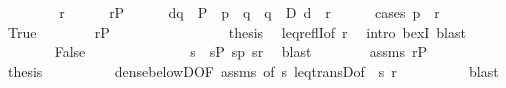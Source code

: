 \begin{isabellebody}
\ \ \isamarkupfalse%
\isanewline
\ \ \ \ \isamarkupfalse%
\ r\isanewline
\ \ \ \ \isamarkupfalse%
\ {\isachardoublequoteopen}r{\isasymin}P{\isachardoublequoteclose}\isanewline
\ \ \ \ \isamarkupfalse%
\ {\isachardoublequoteopen}{\isasymexists}d{\isasymin}{\isacharbraceleft}{\kern0pt}q\ {\isasymin}\ P\ {\isachardot}{\kern0pt}\ p\ {\isasymbottom}\ q\ {\isasymor}\ q\ {\isasymin}\ D{\isacharbraceright}{\kern0pt}{\isachardot}{\kern0pt}\ d\ {\isasympreceq}\ r{\isachardoublequoteclose}\isanewline
\ \ \ \ \isamarkupfalse%
\ {\isacharparenleft}{\kern0pt}cases\ {\isachardoublequoteopen}p\ {\isasymbottom}\ r{\isachardoublequoteclose}{\isacharparenright}{\kern0pt}\isanewline
\ \ \ \ \ \ \isamarkupfalse%
\ True\isanewline
\ \ \ \ \ \ \isamarkupfalse%
\ {\isacartoucheopen}r{\isasymin}P{\isacartoucheclose}\isanewline
\ \ \ \ \ \ \ \ \isanewline
\ \ \ \ \ \ \isamarkupfalse%
\ {\isacharquery}{\kern0pt}thesis\ \isamarkupfalse%
\ leq{\isacharunderscore}{\kern0pt}reflI{\isacharbrackleft}{\kern0pt}of\ r{\isacharbrackright}{\kern0pt}\ \isamarkupfalse%
\ {\isacharparenleft}{\kern0pt}intro\ bexI{\isacharparenright}{\kern0pt}\ {\isacharparenleft}{\kern0pt}blast{\isacharplus}{\kern0pt}{\isacharparenright}{\kern0pt}\isanewline
\ \ \ \ \isamarkupfalse%
\isanewline
\ \ \ \ \ \ \isamarkupfalse%
\ False\isanewline
\ \ \ \ \ \ \isamarkupfalse%
\isanewline
\ \ \ \ \ \ \isamarkupfalse%
\ s\ \ {\isachardoublequoteopen}s{\isasymin}P{\isachardoublequoteclose}\ {\isachardoublequoteopen}s{\isasympreceq}p{\isachardoublequoteclose}\ {\isachardoublequoteopen}s{\isasympreceq}r{\isachardoublequoteclose}\ \isamarkupfalse%
\ blast\isanewline
\ \ \ \ \ \ \isamarkupfalse%
\ assms\ {\isacartoucheopen}r{\isasymin}P{\isacartoucheclose}\isanewline
\ \ \ \ \ \ \isamarkupfalse%
\ {\isacharquery}{\kern0pt}thesis\isanewline
\ \ \ \ \ \ \ \ \isamarkupfalse%
\ dense{\isacharunderscore}{\kern0pt}belowD{\isacharbrackleft}{\kern0pt}OF\ assms{\isacharparenleft}{\kern0pt}{}{\isacharparenright}{\kern0pt}{\isacharcomma}{\kern0pt}\ of\ s{\isacharbrackright}{\kern0pt}\ leq{\isacharunderscore}{\kern0pt}transD{\isacharbrackleft}{\kern0pt}of\ {\isacharunderscore}{\kern0pt}\ s\ r{\isacharbrackright}{\kern0pt}\isanewline
\ \ \ \ \ \ \ \ \isamarkupfalse%
\ blast\isanewline
\ \ \ \ \isamarkupfalse%

\end{isabellebody}
